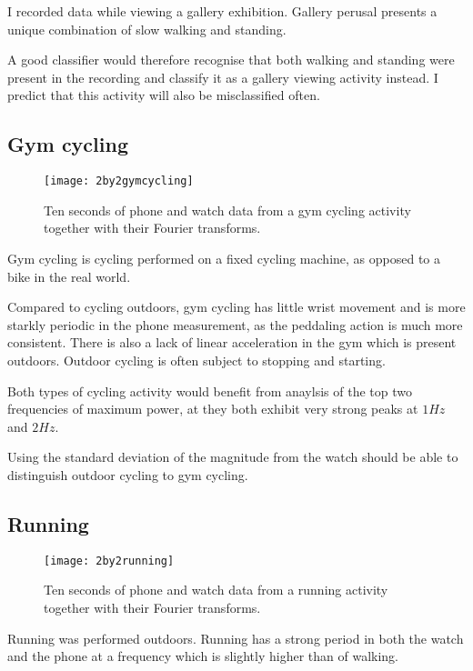      I recorded data while viewing a gallery exhibition. Gallery perusal presents a unique combination of slow walking and standing.
      
      A good classifier would therefore recognise that both walking and standing were present in the recording and classify it as a gallery viewing activity instead. I predict that this activity will also be misclassified often.
    \pagebreak[4]
    \subsection{Gym cycling}
      \begin{figure}[!th]
        \centering
        \texttt{[image: 2by2gymcycling]}
        \caption{Ten seconds of phone and watch data from a gym cycling activity together with their Fourier transforms.}
        \label{fig:2by2gymcycling}
      \end{figure}
      
      Gym cycling is cycling performed on a fixed cycling machine, as opposed to a bike in the real world.
      
      Compared to cycling outdoors, gym cycling has little wrist movement and is more starkly periodic in the phone measurement, as the peddaling action is much more consistent. There is also a lack of linear acceleration in the gym which is present outdoors. Outdoor cycling is often subject to stopping and starting.
      
      Both types of cycling activity would benefit from anaylsis of the top two frequencies of maximum power, at they both exhibit very strong peaks at $1 \si{Hz}$ and $2 \si{Hz}$.
      
      Using the standard deviation of the magnitude from the watch should be able to distinguish outdoor cycling to gym cycling.
    \pagebreak[4]
    \subsection{Running}
      \begin{figure}[!th]
        \centering
        \texttt{[image: 2by2running]}
        \caption{Ten seconds of phone and watch data from a running activity together with their Fourier transforms.}
        \label{fig:2by2running}
      \end{figure}
      
      Running was performed outdoors. Running has a strong period in both the watch and the phone at a frequency which is slightly higher than of walking.
      

